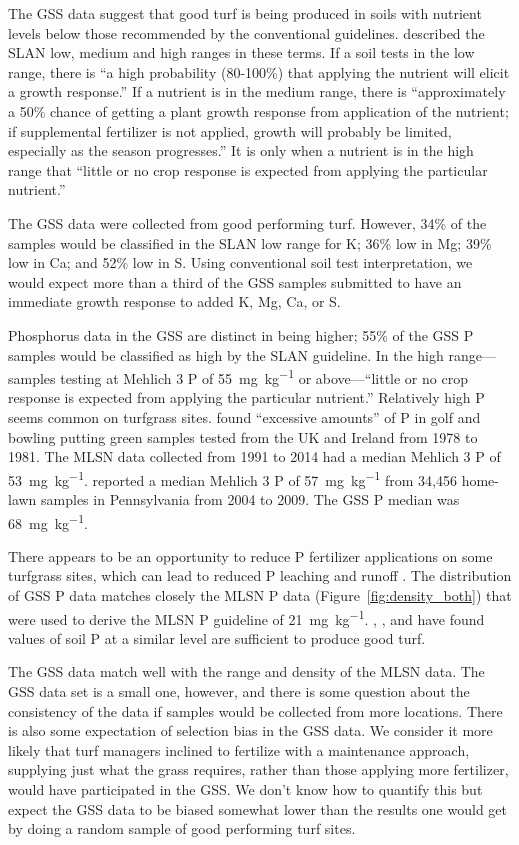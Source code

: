 \documentclass[12pt, a4paper, titlepage]{article}
\begin{document}
The GSS data suggest that good turf is being produced in soils with nutrient levels below those recommended by the conventional guidelines. \textcite{clarifying-3} described the SLAN low, medium and high ranges in these terms. If a soil tests in the low range, there is ``a high probability (80-100\%) that applying the nutrient will elicit a growth response.'' If a nutrient is in the medium range, there is ``approximately a 50\% chance of getting a plant growth response from application of the nutrient; if supplemental fertilizer is not applied, growth will probably be limited, especially as the season progresses.'' It is only when a nutrient is in the high range that ``little or no crop response is expected from applying the particular nutrient.''

The GSS data were collected from good performing turf. However, 34\% of the samples would be classified in the SLAN low range for K; 36\% low in Mg; 39\% low in Ca; and 52\% low in S. Using conventional soil test interpretation, we would expect more than a third of the GSS samples submitted to have an immediate growth response to added K, Mg, Ca, or S.

Phosphorus data in the GSS are distinct in being higher; 55\% of the GSS P samples would be classified as high by the SLAN guideline. In the high range---samples testing at Mehlich 3 P of \SI{55}{\mg\per\kg} or above---``little or no crop response is expected from applying the particular nutrient.'' Relatively high P seems common on turfgrass sites. \textcite{stansfield85} found ``excessive amounts'' of P in golf and bowling putting green samples tested from the UK and Ireland from 1978 to 1981. The MLSN data collected from 1991 to 2014 had a median Mehlich 3 P of \SI{53}{\mg\per\kg}. \textcite{landschoot2014} reported a median Mehlich 3 P of \SI{57}{\mg\per\kg} from 34,456 home-lawn samples in Pennsylvania from 2004 to 2009. The GSS P median was \SI{68}{\mg\per\kg}.

There appears to be an opportunity to reduce P fertilizer applications on some turfgrass sites, which can lead to reduced P leaching and runoff \parencite{bock2020, soldat2008}. The distribution of GSS P data matches closely the MLSN P data (Figure~\ref{fig:density_both}) that were used to derive the MLSN P guideline of \SI{21}{\mg\per\kg}. \textcite{kreuser2012}, \textcite{raley2013}, and \textcite{ogaard2020} have found values of soil P at a similar level are sufficient to produce good turf. 

The GSS data match well with the range and density of the MLSN data. The GSS data set is a small one, however, and there is some question about the consistency of the data if samples would be collected from more locations. There is also some expectation of selection bias in the GSS data. We consider it more likely that turf managers inclined to fertilize with a maintenance approach, supplying just what the grass requires, rather than those applying more fertilizer, would have participated in the GSS. We don't know how to quantify this but expect the GSS data to be biased somewhat lower than the results one would get by doing a random sample of good performing turf sites.
\end{document}
